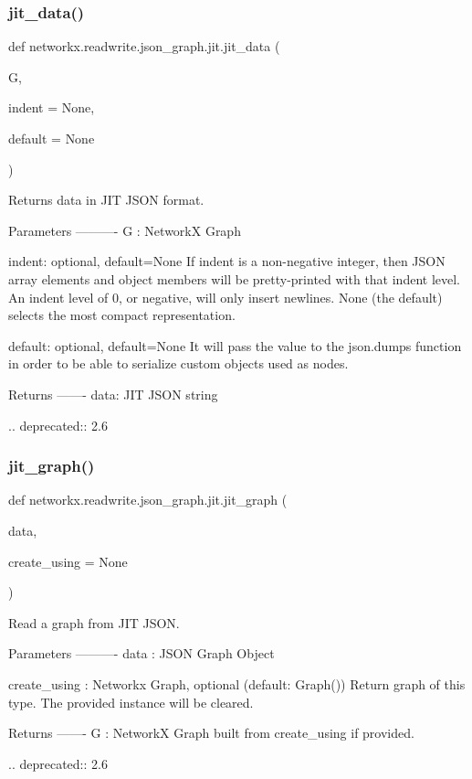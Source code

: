 \subsubsection{\texorpdfstring{jit\+\_\+data()}{jit\_data()}}
{\footnotesize\ttfamily def networkx.\+readwrite.\+json\+\_\+graph.\+jit.\+jit\+\_\+data (\begin{DoxyParamCaption}\item[{}]{G,  }\item[{}]{indent = {\ttfamily None},  }\item[{}]{default = {\ttfamily None} }\end{DoxyParamCaption})}

\begin{DoxyVerb}Returns data in JIT JSON format.

Parameters
----------
G : NetworkX Graph

indent: optional, default=None
    If indent is a non-negative integer, then JSON array elements and
    object members will be pretty-printed with that indent level.
    An indent level of 0, or negative, will only insert newlines.
    None (the default) selects the most compact representation.

default: optional, default=None
     It will pass the value to the json.dumps function in order to
     be able to serialize custom objects used as nodes.

Returns
-------
data: JIT JSON string

.. deprecated:: 2.6
\end{DoxyVerb}
 \mbox{\label{namespacenetworkx_1_1readwrite_1_1json__graph_1_1jit_a24093822676235f68daa49c91aa59f80}} 
\subsubsection{\texorpdfstring{jit\+\_\+graph()}{jit\_graph()}}
{\footnotesize\ttfamily def networkx.\+readwrite.\+json\+\_\+graph.\+jit.\+jit\+\_\+graph (\begin{DoxyParamCaption}\item[{}]{data,  }\item[{}]{create\+\_\+using = {\ttfamily None} }\end{DoxyParamCaption})}

\begin{DoxyVerb}Read a graph from JIT JSON.

Parameters
----------
data : JSON Graph Object

create_using : Networkx Graph, optional (default: Graph())
    Return graph of this type. The provided instance will be cleared.

Returns
-------
G : NetworkX Graph built from create_using if provided.

.. deprecated:: 2.6
\end{DoxyVerb}
 